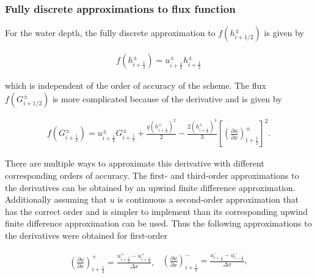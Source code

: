 \documentclass[SingleSpace,12pt]{Serre_ASCE}
\begin{document}
\subsubsection{Fully discrete approximations to flux function} %
For the water depth, the fully discrete approximation to $f(h^\pm_{i + 1/2})$ is given by
\begin{linenomath*}
\begin{gather}\label{eq:fforheightp}
f\left(h^\pm_{i + \frac{1}{2}}\right) = u^\pm_{i + \frac{1}{2}} h^\pm_{i + \frac{1}{2}}
\end{gather}
\end{linenomath*}
which is independent of the order of accuracy of the scheme. The flux $f(G^\pm_{i + 1/2})$ is more complicated because of the derivative and is given by
\begin{linenomath*}
\begin{gather}\label{eq:fforGp}
f\left(G^\pm_{i + \frac{1}{2}}\right)= u^\pm_{i + \frac{1}{2}} G^\pm_{i + \frac{1}{2}} + \frac{g \left(h^\pm_{i + \frac{1}{2}} \right)^2}{2} - \frac{2 \left(h^\pm_{i + \frac{1}{2}} \right)^3}{3} \left[\left(\frac{\partial u}{\partial x}\right)^\pm_{i + \frac{1}{2}}\right]^2.
\end{gather}
\end{linenomath*}
There are multiple ways to approximate this derivative with different corresponding orders of accuracy. The first- and third-order approximations to the derivatives can be obtained by an upwind finite difference approximation. Additionally assuming that $u$ is continuous a second-order approximation that has the correct order and is simpler to implement than its corresponding upwind finite difference approximation can be used. Thus the following approximations to the derivatives were obtained for first-order
\begin{linenomath*}
\begin{subequations}
\begin{gather}\label{eq:derivdisco1p}
\left(\frac{\partial u}{\partial x}\right)^+_{i + \frac{1}{2}} = \frac{ u^+_{i + \frac{3}{2}} - u^+_{i + \frac{1}{2}}}{\Delta x},
\end{gather}
\begin{gather}\label{eq:derivdisco1m}
\left(\frac{\partial u}{\partial x}\right)^-_{i + \frac{1}{2}} = \frac{ u^-_{i + \frac{1}{2}} - u^-_{i - \frac{1}{2}}}{\Delta x},
\end{gather}
\end{subequations}
\label{eq:derivdisco1}
\end{linenomath*}
\end{document}
